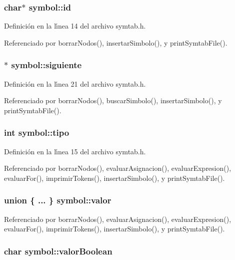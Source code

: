 \subsubsection{\setlength{\rightskip}{0pt plus 5cm}char$\ast$ {\bf symbol::id}}\label{structsymbol_o0}




Definici\'{o}n en la l\'{\i}nea 14 del archivo symtab.h.

Referenciado por borrar\-Nodos(), insertar\-Simbolo(), y print\-Symtab\-File().
\subsubsection{$\ast$ {\bf symbol::siguiente}}\label{structsymbol_o6}




Definici\'{o}n en la l\'{\i}nea 21 del archivo symtab.h.

Referenciado por borrar\-Nodos(), buscar\-Simbolo(), insertar\-Simbolo(), y print\-Symtab\-File().
\subsubsection{\setlength{\rightskip}{0pt plus 5cm}int {\bf symbol::tipo}}\label{structsymbol_o1}




Definici\'{o}n en la l\'{\i}nea 15 del archivo symtab.h.

Referenciado por borrar\-Nodos(), evaluar\-Asignacion(), evaluar\-Expresion(), evaluar\-For(), imprimir\-Tokens(), insertar\-Simbolo(), y print\-Symtab\-File().
\subsubsection{\setlength{\rightskip}{0pt plus 5cm}union \{ ... \}  {\bf symbol::valor}}\label{structsymbol_o5}




Referenciado por borrar\-Nodos(), evaluar\-Asignacion(), evaluar\-Expresion(), evaluar\-For(), imprimir\-Tokens(), insertar\-Simbolo(), y print\-Symtab\-File().
\subsubsection{\setlength{\rightskip}{0pt plus 5cm}char {\bf symbol::valor\-Boolean}}\label{structsymbol_o4}




